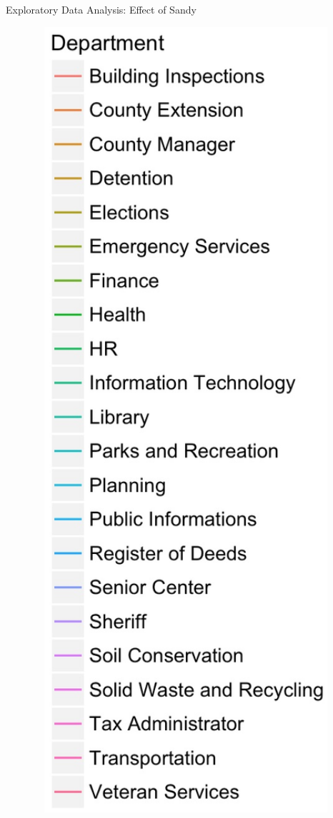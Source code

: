 \documentclass[10pt]{beamer}
\theoremstyle{definition}
\theoremstyle{remark}
\begin{document}
\begin{frame}{Exploratory Data Analysis: Effect of Sandy}
\begin{minipage}{0.13\linewidth}
\begin{figure}
	 		 		 	\includegraphics[width=1.25\textwidth]{figures/Dept2.jpg}
	 \end{figure}	
	\end{minipage}
\end{frame}
\end{document}
